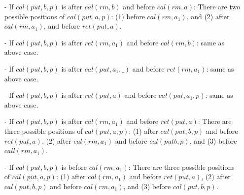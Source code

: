\begin{itemize}
\setlength{\itemsep}{0.5pt}
\item[-] If $\textit{cal}(\textit{put},b,p)$ is after $\textit{cal}(\textit{rm},b)$ and before $\textit{cal}(\textit{rm},a)$: There are two possible positions of $\textit{cal}(\textit{put},a,p)$: (1) before $\textit{cal}(\textit{rm},a_1)$, and (2) after $\textit{cal}(\textit{rm},a_1)$, and before $\textit{ret}(\textit{put},a)$.

\item[-] If $\textit{cal}(\textit{put},b,p)$ is after $\textit{ret}(\textit{rm},a_1)$ and before $\textit{cal}(\textit{rm},b)$: same as above case.

\item[-] If $\textit{cal}(\textit{put},b,p)$ is after $\textit{cal}(\textit{put},a_1,\_)$ and before $\textit{ret}(\textit{rm},a_1)$: same as above case.

\item[-] If $\textit{cal}(\textit{put},b,p)$ is after $\textit{ret}(\textit{put},a)$ and before $\textit{cal}(\textit{put},a_1,p)$: same as above case.

\item[-] If $\textit{cal}(\textit{put},b,p)$ is after $\textit{cal}(\textit{rm},a_1)$ and before $\textit{ret}(\textit{put},a)$: There are three possible positions of $\textit{cal}(\textit{put},a,p)$: (1) after $\textit{cal}(\textit{put},b,p)$ and before $\textit{ret}(\textit{put},a)$, (2) after $\textit{cal}(\textit{rm},a_1)$ and before $\textit{cal}(\textit{put}b,p)$, and (3) before $\textit{call}(\textit{rm},a_1)$.

\item[-] If $\textit{cal}(\textit{put},b,p)$ is before $\textit{cal}(\textit{rm},a_1)$: There are three possible positions of $\textit{cal}(\textit{put},a,p)$: (1) after $\textit{cal}(\textit{rm},a_1)$ and before $\textit{ret}(\textit{put},a)$, (2) after $\textit{cal}(\textit{put},b,p)$ and before $\textit{cal}(\textit{rm},a_1)$, and (3) before $\textit{cal}(\textit{put},b,p)$.
\end{itemize}

